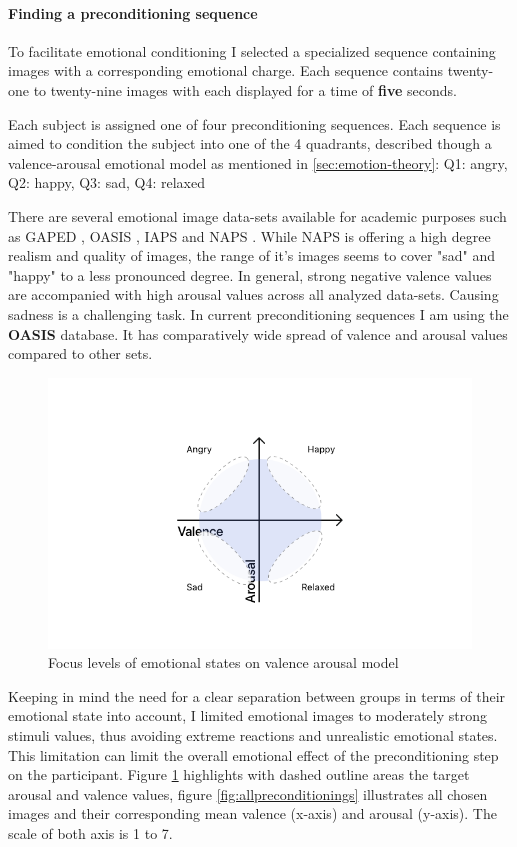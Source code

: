 \paragraph{Finding a preconditioning sequence}
To facilitate emotional conditioning I selected a specialized sequence containing images with a corresponding emotional charge.
Each sequence contains twenty-one to twenty-nine images with each displayed for a time of \textbf{five} seconds.

Each subject is assigned one of four preconditioning sequences. Each sequence is aimed to condition the subject into one of the 4 quadrants, described though a valence-arousal emotional model as mentioned in \ref{sec:emotion-theory}: Q1: angry, Q2: happy, Q3: sad, Q4: relaxed

There are several emotional image data-sets available for academic purposes such as GAPED \cite{Dan-Glauser2011}, OASIS \cite{Kurdi2017}, IAPS \cite{Lang1997} and NAPS \cite{Marchewka2014}. While NAPS is offering a high degree realism and quality of images, the range of it's images seems to cover "sad" and "happy" to a less pronounced degree. In general, strong negative valence values are accompanied with high arousal values across all analyzed data-sets. Causing sadness is a challenging task. In current preconditioning sequences I am using the \textbf{OASIS} database. It has comparatively wide spread of valence and arousal values compared to other sets.

\begin{figure}
	\centering
	\includegraphics[width=0.7\linewidth]{graphics/Valence-Arousal-Model-1.png}
	\caption{Focus levels of emotional states on valence arousal model}
	\label{fig:valence-arousal-model-2}
\end{figure}

Keeping in mind the need for a clear separation between groups in terms of their emotional state into account, I limited emotional images to moderately strong stimuli values, thus avoiding extreme reactions and unrealistic emotional states. This limitation can limit the overall emotional effect of the preconditioning step on the participant. Figure \ref{fig:valence-arousal-model-2} highlights with dashed outline areas the target arousal and valence values, figure \ref{fig:allpreconditionings} illustrates all chosen images and their corresponding mean valence (x-axis) and arousal (y-axis). The scale of both axis is 1 to 7.

